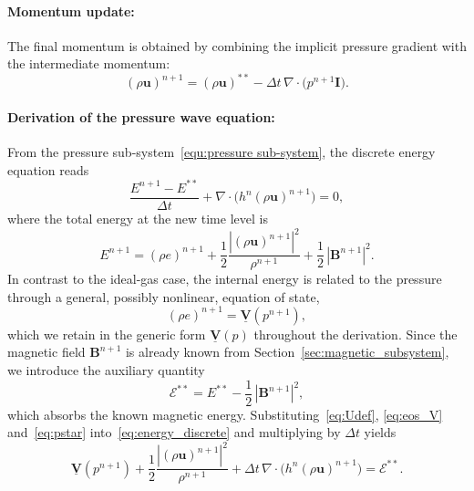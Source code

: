 \documentclass[a4paper,fleqn]{cas-sc}
\theoremstyle{definition}
\theoremstyle{remark}
\begin{document}
\paragraph{Momentum update:}
The final momentum is obtained by combining the implicit pressure gradient with the
intermediate momentum:
\begin{equation}
\label{equ:finalrhou}
(\rho\mathbf{u})^{n+1} = (\rho\mathbf{u})^{**}
- \Delta t\,\nabla\!\cdot\!\big(p^{n+1}\mathbf{I}\big).
\end{equation}

\paragraph{Derivation of the pressure wave equation:}
From the pressure sub-system~\eqref{equ:pressure sub-system}, the discrete energy
equation reads
\begin{equation}
\label{eq:energy_discrete}
\frac{E^{n+1}-E^{**}}{\Delta t}
+ \nabla\!\cdot\!\big(h^{n}(\rho\mathbf{u})^{n+1}\big) = 0,
\end{equation}
where the total energy at the new time level is
\begin{equation}
\label{eq:Udef}
E^{n+1} = (\rho e)^{n+1}
+ \frac{1}{2}\frac{|(\rho\mathbf{u})^{n+1}|^{2}}{\rho^{n+1}}
+ \frac{1}{2}\,|\mathbf{B}^{n+1}|^{2}.
\end{equation}
In contrast to the ideal-gas case, the internal energy is related to the pressure
through a general, possibly nonlinear, equation of state,
\begin{equation}
\label{eq:eos_V}
(\rho e)^{n+1} = \underline{\mathbf{V}}(p^{n+1}),
\end{equation}
which we retain in the generic form $\underline{\mathbf{V}}(p)$ throughout the
derivation. Since the magnetic field $\mathbf{B}^{n+1}$ is already known from
Section~\ref{sec:magnetic_subsystem}, we introduce the auxiliary quantity
\begin{equation}
\label{eq:pstar}
\mathcal{E}^{**} = E^{**} - \frac{1}{2}\,|\mathbf{B}^{n+1}|^{2},
\end{equation}
which absorbs the known magnetic energy. Substituting~\eqref{eq:Udef},
\eqref{eq:eos_V} and~\eqref{eq:pstar} into~\eqref{eq:energy_discrete} and
multiplying by $\Delta t$ yields
\begin{equation}
\label{eq:intermediate}
\underline{\mathbf{V}}(p^{n+1})
+ \frac{1}{2}\frac{|(\rho\mathbf{u})^{n+1}|^{2}}{\rho^{n+1}}
+ \Delta t\,\nabla\!\cdot\!\big(h^{n}(\rho\mathbf{u})^{n+1}\big)
= \mathcal{E}^{**}.
\end{equation}
\end{document}
